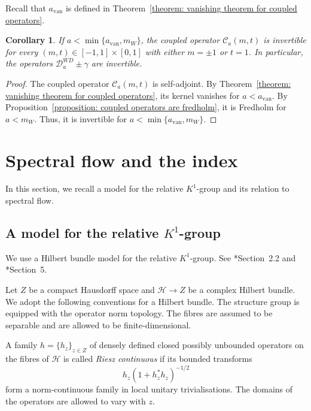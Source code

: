 \documentclass[a4paper,oneside,12pt]{amsart}
\theoremstyle{plain}
\newtheorem{corollary}[theorem]{Corollary}
\theoremstyle{definition}
\theoremstyle{remark}
\newcommand{\mesoscopicWilsonDiracoperator}[1][a]{\mathcal{D}_{#1}^{\mathit{WD}}}
\newcommand{\coupledoperator}[3][a]{\mathcal{C}_{#1}(#2,#3)}
\newcommand{\constantAvan}{a_{\mathrm{van}}}
\begin{document}
 Recall that $\constantAvan$ is defined in Theorem~\ref{theorem: vanishing theorem for coupled operators}.
\begin{corollary}\label{corollary: invertibility at endpoints}
  If $a < \min\{\constantAvan,m_W\}$, the coupled operator $\coupledoperator{m}{t}$ is invertible for every $(m,t) \in [-1,1] \times [0,1]$ with either $m = \pm 1$ or $t=1$.
  In particular, the operators $\mesoscopicWilsonDiracoperator \pm \gamma$ are invertible.
\end{corollary}
\begin{proof}
  The coupled operator $\coupledoperator{m}{t}$ is self-adjoint.
  By Theorem~\ref{theorem: vanishing theorem for coupled operators}, its kernel vanishes for $a < \constantAvan$.
  By Proposition~\ref{proposition: coupled operators are fredholm}, it is Fredholm for $a < m_W$.
  Thus, it is invertible for $a < \min\{\constantAvan,m_W\}$.
\end{proof}

\section{Spectral flow and the index}\label{section: Spectral flow and the index}

In this section, we recall a model for the relative $K^1$-group and its relation to spectral flow.

\subsection{A model for the relative \texorpdfstring{$K^1$}{K1}-group}

We use a Hilbert bundle model for the relative $K^1$-group.
See \cite{MR5076866}*{Section~2.2} and \cite{afffmoy}*{Section~5}.

Let $Z$ be a compact Hausdorff space and $\mathcal{H} \to Z$ be a complex Hilbert bundle.
We adopt the following conventions for a Hilbert bundle.
The structure group is equipped with the operator norm topology.
The fibres are assumed to be separable and are allowed to be finite-dimensional.

A family $h = \{ h_z \}_{z \in Z}$ of densely defined closed possibly unbounded operators on the fibres of $\mathcal{H}$ is called \emph{Riesz continuous} if its bounded transforms
\begin{equation}
  h_z (1 + h_z^* h_z)^{-1/2}
\end{equation}
form a norm-continuous family in local unitary trivialisations.
The domains of the operators are allowed to vary with $z$.
\end{document}
